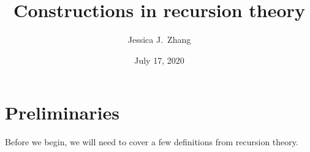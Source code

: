 \documentclass{article}
\title{Constructions in recursion theory}
\author{Jessica J.~Zhang}
\date{July 17, 2020}
\begin{document}
\maketitle

\section{Preliminaries}
Before we begin, we will need to cover a few definitions from recursion theory. 
\end{document}
